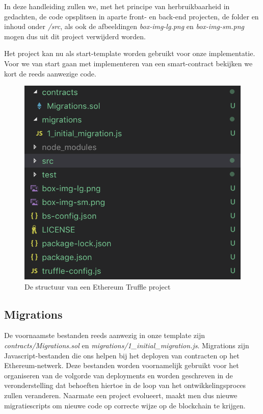 	In deze handleiding zullen we, met het principe van herbruikbaarheid in gedachten, de code opsplitsen in aparte front- en back-end projecten, de folder en inhoud onder \textit{\slash src}, als ook de afbeeldingen \textit{box-img-lg.png} en \textit{box-img-sm.png} mogen dus uit dit project verwijderd worden.
	
	Het project kan nu als start-template worden gebruikt voor onze implementatie. Voor we van start gaan met implementeren van een smart-contract bekijken we kort de reeds aanwezige code.
	
	\begin{figure}
		\centering
		\includegraphics[width=\linewidth/2]{img/truffle-template.png}
		\caption{De structuur van een Ethereum Truffle project}
		\label{fig:truffle-template}
	\end{figure}
	
	\subsection{Migrations}
	De voornaamste bestanden reeds aanwezig in onze template zijn \textit{contracts\slash Migrations.sol} en \textit{migrations\slash 1\_initial\_migration.js}.
	Migrations zijn Javascript-bestanden die  ons helpen bij het deployen van contracten op het Ethereum-netwerk. Deze bestanden worden voornamelijk gebruikt voor het organiseren van de volgorde van deployments en worden geschreven in de veronderstelling dat behoeften hiertoe  in de loop van het ontwikkelingsproces  zullen veranderen. Naarmate een project evolueert, maakt men dus nieuwe migratiescripts om nieuwe code op correcte wijze op de blockchain te krijgen. 
	
